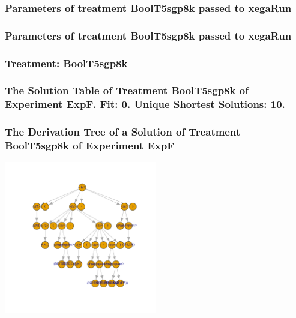 \documentclass[18pt,c]{beamer}
\begin{document}

 \begin{frame}
 \fontsize{8pt}{9pt}\selectfont
 \frametitle{  Parameters of treatment BoolT5sgp8k passed to xegaRun
 }

 \label{ExpFtParmTable038.tex}  
 \end{frame}


 \begin{frame}
 \fontsize{8pt}{9pt}\selectfont
 \frametitle{  Parameters of treatment BoolT5sgp8k passed to xegaRun
 }

 \label{ExpFtParmTable039.tex}  
 \end{frame}

 \begin{frame}
 \fontsize{8pt}{9pt}\selectfont
 \frametitle{ Treatment: BoolT5sgp8k }

 \label{ExpFStatsTable015.tex}  
 \end{frame}

 \begin{frame}
 \fontsize{8pt}{9pt}\selectfont
 \frametitle{ The Solution Table of Treatment BoolT5sgp8k of Experiment ExpF. Fit: 0. Unique Shortest Solutions: 10. }

 \label{ExpFSolutionTable009.tex}  
 \end{frame}

 \begin{frame}
 \frametitle{ The Derivation Tree of a Solution of Treatment BoolT5sgp8k of Experiment ExpF }
 \begin{center}
\includegraphics[width=0.5\textwidth, angle=0]
{ExpFDerivationTreeFigure009.pdf}
 \end{center}
 \label{report/ExpFDerivationTreeFigure009.pdf}  
 \end{frame}
\end{document}
